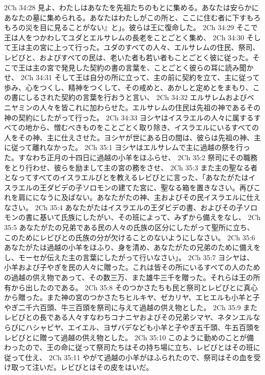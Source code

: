 2Ch 34:28  見よ、わたしはあなたを先祖たちのもとに集める。あなたは安らかにあなたの墓に集められる。あなたはわたしがこの所と、ここに住む者に下すもろもろの災を目に見ることがない』と」。彼らは王に復命した。
2Ch 34:29  そこで王は人をつかわしてユダとエルサレムの長老をことごとく集め、
2Ch 34:30  そして王は主の宮に上って行った。ユダのすべての人々、エルサレムの住民、祭司、レビびと、およびすべての民は、老いた者も若い者もことごとく彼に従った。そこで王は主の宮で発見した契約の書の言葉を、ことごとく彼らの耳に読み聞かせ、
2Ch 34:31  そして王は自分の所に立って、主の前に契約を立て、主に従って歩み、心をつくし、精神をつくして、その戒めと、あかしと定めとをまもり、この書にしるされた契約の言葉を行おうと言い、
2Ch 34:32  エルサレムおよびベニヤミンの人々を皆これに加わらせた。エルサレムの住民は先祖の神であるその神の契約にしたがって行った。
2Ch 34:33  ヨシヤはイスラエルの人々に属するすべての地から、憎むべきものをことごとく取り除き、イスラエルにいるすべての人をその神、主に仕えさせた。ヨシヤが世にある日の間は、彼らは先祖の神、主に従って離れなかった。
2Ch 35:1  ヨシヤはエルサレムで主に過越の祭を行った。すなわち正月の十四日に過越の小羊をほふらせ、
2Ch 35:2  祭司にその職務をとり行わせ、彼らを励まして主の宮の務をさせ、
2Ch 35:3  また主の聖なる者となってすべてのイスラエルびとを教えるレビびとに言った、「あなたがたはイスラエルの王ダビデの子ソロモンの建てた宮に、聖なる箱を置きなさい。再びこれを肩にになうに及ばない。あなたがたの神、主およびその民イスラエルに仕えなさい。
2Ch 35:4  あなたがたはイスラエルの王ダビデの書、およびその子ソロモンの書に基いて氏族にしたがい、その班によって、みずから備えをなし、
2Ch 35:5  あなたがたの兄弟である民の人々の氏族の区分にしたがって聖所に立ち、このためにレビびとの氏族の分が欠けることのないようにしなさい。
2Ch 35:6  あなたがたは過越の小羊をほふり、身を清め、あなたがたの兄弟のために備えをし、モーセが伝えた主の言葉にしたがって行いなさい」。
2Ch 35:7  ヨシヤは、小羊および子やぎを民の人々に贈った。これは皆その所にいるすべての人のための過越の供え物であって、その数三万、また雄牛三千を贈った。それらは王の所有から出したのである。
2Ch 35:8  そのつかさたちも民と祭司とレビびとに真心から贈った。また神の宮のつかさたちヒルキヤ、ゼカリヤ、エヒエルも小羊と子やぎ二千六百頭、牛三百頭を祭司に与えて過越の供え物とした。
2Ch 35:9  またレビびとの長である人々すなわちコナニヤおよびその兄弟シマヤ、ネタンエルならびにハシャビヤ、エイエル、ヨザバデなども小羊と子やぎ五千頭、牛五百頭をレビびとに贈って過越の供え物とした。
2Ch 35:10  このように勤めのことが備わったので、王の命に従って祭司たちはその持ち場に立ち、レビびとはその班に従って仕え、
2Ch 35:11  やがて過越の小羊がほふられたので、祭司はその血を受け取って注いだ。レビびとはその皮をはいだ。
